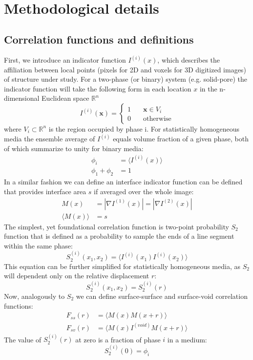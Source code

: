 \documentclass[reprint,amsmath,amssymb,aps,pre]{revtex4-1}
\begin{document}
\section{Methodological details}
\label{sec:details}
\subsection{Correlation functions and definitions}
First, we introduce an indicator function $I^{(i)}(x)$, which describes the
affiliation between local points (pixels for 2D and voxels for 3D digitized
images) of structure under study. For a two-phase (or binary) system
(e.g. solid-pore) the indicator function will take the following form in each
location $x$ in the n-dimensional Euclidean space $\mathbb{R}^n$
\begin{equation*}
  I^{(i)}(\mathbf{x}) = \left\{
  \begin{array}{ll}
    1 & \quad \mathbf{x} \in V_i \\
    0 & \quad \text{otherwise}
  \end{array}
  \right.
\end{equation*}
where $V_i \subset \mathbb{R}^n$ is the region occupied by phase i. For
statistically homogeneous media the ensemble average of $I^{(i)}$ equals volume
fraction of a given phase, both of which summarize to unity for binary media:
\begin{align*}
  \phi_i &= \langle I^{(i)}(x) \rangle \\
  \phi_1 + \phi_2 &= 1
\end{align*}
In a similar fashion we can define an interface indicator function can be
defined that provides interface area $s$ if averaged over the whole image:
\begin{align}
  M(x) &= |\nabla I^{(1)}(x)| =|\nabla I^{(2)}(x)| \label{eq:interface} \\
  \langle M(x) \rangle &= s
\end{align}
The simplest, yet foundational correlation function is two-point probability
$S_2$ function that is defined as a probability to sample the ends of a line
segment within the same phase:
\begin{equation}
  S_2^{(i)}(x_1, x_2) = \langle I^{(i)}(x_1) I^{(i)}(x_2) \rangle \label{eq:twopoint}
\end{equation}
This equation can be further simplified for statistically homogeneous media, as
$S_2$ will dependent only on the relative displacement $r$:
\begin{equation*}
  S_2^{(i)}(x_1, x_2) = S_2^{(i)}(r)
\end{equation*}
Now, analogously to $S_2$ we can define surface-surface and surface-void
correlation functions:
\begin{align}
  F_{ss}(r) &= \langle M(x)M(x+r) \rangle \label{eq:fss} \\
  F_{sv}(r) &= \langle M(x)I^{(void)}M(x+r) \label{eq:fsv} \rangle
\end{align}
The value of $S^{(i)}_2(r)$ at zero is a fraction of phase $i$ in a medium:
\begin{equation}
  S_2^{(i)}(0) = \phi_i \label{eq:s2porosity}
\end{equation}
\end{document}
